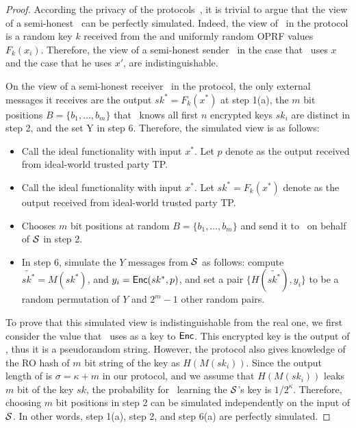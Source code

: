 \begin{proof}

\medskip
{} 
According the privacy of the \batchOPRF protocols~\cite{CCS:KKRT16}, it is trivial to argue that the view of a semi-honest \SS\ can be perfectly simulated. Indeed, the view of \SS\ in the protocol is a random key $k$ received from the \batchOPRF and uniformly random OPRF values $F_k(x_i)$. Therefore, the view of a semi-honest sender \SS\, in the case that \RR\  uses $x$ and the case that he uses  $x'$, are indistinguishable. 

\medskip
{} On the view of a semi-honest receiver \RR\ in the protocol, the only external messages it receives are the \batchOPRF output $sk^*=F_k(x^*)$ at step 1(a), the $m$ bit positions $B=\{b_1,  \ldots, b_m\}$ that \RR\ knows all first $n$ encrypted keys $sk_i$ are distinct in step 2, and the set Y in step 6. Therefore, the simulated view is as follows:
 \begin{itemize}
 	\item Call the ideal \SSOT functionality with input $x^*$. Let $p$ denote as the output received from ideal-world trusted party TP.
 	
 	\item Call the ideal \batchOPRF functionality with input $x^*$. Let $sk^*=F_k(x^*)$ denote as the output received from ideal-world trusted party TP.
 	
 	
 	\item Chooses $m$ bit positions at random $B=\{b_1,  \ldots, b_m\}$ and send it to \RR\ on behalf of $\mathcal{S}$ in step 2.
 	
 	\item In step 6, simulate the $Y$ messages from $\mathcal{S}$ as follows:
 	compute  $\tilde{sk^*} = M( sk^*)$, and $y_i = \mathsf{Enc}( sk^*, p)$, and set a pair $\{H(\tilde{sk^*}), y_i \}$ to be a random permutation of $Y$ and $2^m-1$ other random pairs.
 	
 \end{itemize}

To prove that this simulated view is indistinguishable from the real one, we first consider the value that \SS\ uses as a key to $\mathsf{Enc}$. This encrypted key is the output of \batchOPRF, thus it is a pseudorandom string. However, the protocol also gives knowledge of the RO hash of $m$ bit string of the key as $H(M(sk_i))$. Since the output length of \batchOPRF is $\sigma=\kappa+m$ in our protocol, and we assume that $H(M(sk_i))$ leaks $m$ bit of the key $sk$, the probability for \RR\ learning the $\mathcal{S}$'s key is $1/2^\kappa$. Therefore, choosing $m$ bit positions in step 2 can be simulated independently on the input of $\mathcal{S}$. In other words, step 1(a), step 2, and step 6(a) are perfectly simulated.


\end{proof}
